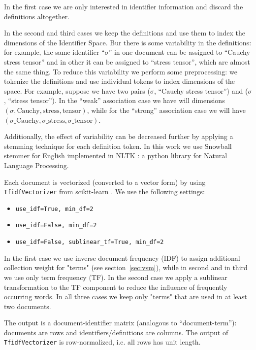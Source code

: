 In the first case we are only interested in identifier information and 
discard the definitions altogether. 

In the second and third cases we keep the definitions and use them to 
index the dimensions of the Identifier Space. Bur there is some 
variability in the definitions: for example, the same identifier 
``$\sigma$'' in one document can be assigned to ``Cauchy stress tensor'' and
in other it can be assigned to ``stress tensor'', which are almost the same thing. 
To reduce this variability we perform some preprocessing: we tokenize 
the definitions and use individual tokens to index dimensions of the space. 
For example, suppose we have two pairs ($\sigma$, ``Cauchy stress tensor'') 
and ($\sigma$, ``stress tensor''). In the ``weak'' association case
we have will dimensions $(\sigma, \text{Cauchy}, \text{stress}, \text{tensor})$,
while for the ``strong'' association case we will have 
$(\sigma\text{\_Cauchy}, \sigma\text{\_stress}, \sigma\text{\_tensor})$.

Additionally, the effect of variability can be decreased further
by applying a stemming technique for each definition token. 
In this work we use Snowball stemmer for English \cite{porter2001snowball} 
implemented in NLTK \cite{bird2006nltk}: a python library for 
Natural Language Processing. 

Each document is vectorized (converted to a vector form) by using
\verb|TfidfVectorizer| from  scikit-learn \cite{scikit-learn}. 
We use the following settings: 

\begin{itemize}
  \item \verb|use_idf=True, min_df=2|
  \item \verb|use_idf=False, min_df=2|
  \item \verb|use_idf=False, sublinear_tf=True, min_df=2|
\end{itemize}


In the first case we use inverse document frequency (IDF) to assign additional 
collection weight for "terms"
(see section~\ref{sec:vsm}), while in second and in third we use only 
term frequency (TF).
In the second case we apply a sublinear transformation to the TF component
to reduce  the influence of frequently occurring words. 
In all three cases we keep 
only "terms" that are used in at least two documents. 

The output is a document-identifier matrix (analogous to ``document-term''):
documents are rows and identifiers/definitions are columns. 
The output of \verb|TfidfVectorizer| is row-normalized, i.e.
all rows has unit length. 


